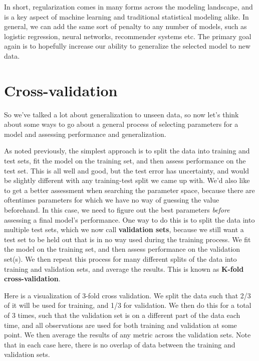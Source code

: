 \documentclass[
  letterpaper,
]{krantz}
\begin{document}
In short, regularization comes in many forms across the modeling
landscape, and is a key aspect of machine learning and traditional
statistical modeling alike. In general, we can add the same sort of
penalty to any number of models, such as logistic regression, neural
networks, recommender systems etc. The primary goal again is to
hopefully increase our ability to generalize the selected model to new
data.

\section{Cross-validation}\label{cross-validation}

So we've talked a lot about generalization to unseen data, so now let's
think about some ways to go about a general process of selecting
parameters for a model and assessing performance and generalization.

As noted previously, the simplest approach is to split the data into
training and test sets, fit the model on the training set, and then
assess performance on the test set. This is all well and good, but the
test error has uncertainty, and would be slightly different with any
training-test split we came up with. We'd also like to get a better
assessment when searching the parameter space, because there are
oftentimes parameters for which we have no way of guessing the value
beforehand. In this case, we need to figure out the best parameters
\emph{before} assessing a final model's performance. One way to do this
is to split the data into multiple test sets, which we now call
\textbf{validation sets}, because we still want a test set to be held
out that is in no way used during the training process. We fit the model
on the training set, and then assess performance on the validation
set(s). We then repeat this process for many different splits of the
data into training and validation sets, and average the results. This is
known as \textbf{K-fold cross-validation}.

Here is a visualization of 3-fold cross validation. We split the data
such that 2/3 of it will be used for training, and 1/3 for validation.
We then do this for a total of 3 times, such that the validation set is
on a different part of the data each time, and all observations are used
for both training and validation at some point. We then average the
results of any metric across the validation sets. Note that in each case
here, there is no overlap of data between the training and validation
sets.
\end{document}
